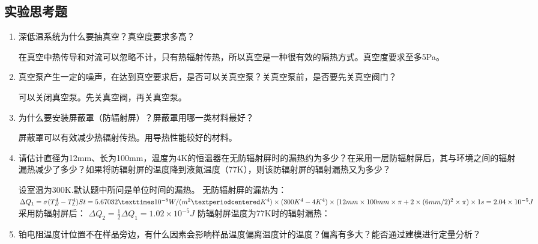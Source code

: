 \documentclass{spaexp}
\begin{document}
        \subsection{实验思考题}
        \begin{enumerate}
            \item 深低温系统为什么要抽真空？真空度要求多高？
            \begin{ans}
                在真空中热传导和对流可以忽略不计，只有热辐射传热，所以真空是一种很有效的隔热方式。真空度要求至多5Pa。
            \end{ans}

            \item 真空泵产生一定的噪声，在达到真空要求后，是否可以关真空泵？关真空泵前，是否要先关真空阀门？
            \begin{ans}
                可以关闭真空泵。先关真空阀，再关真空泵。
            \end{ans}
            
            \item 为什么要安装屏蔽罩（防辐射屏）？屏蔽罩用哪一类材料最好？
            \begin{ans}
                屏蔽罩可以有效减少热辐射传热。用导热性能较好的材料。
            \end{ans}

            \item 请估计直径为12mm、长为100mm，温度为4K的恒温器在无防辐射屏时的漏热约为多少？在采用一层防辐射屏后，其与环境之间的辐射漏热减少了多少？如果将防辐射屏的温度降到液氮温度（77K），则该防辐射屏的辐射漏热又为多少？
            \begin{ans}
                设室温为300K.默认题中所问是单位时间的漏热。
                无防辐射屏的漏热为：
                $\Delta Q_1 = \sigma(T_E^4 - T_L^4)St \\= 5.67032×10^{-8}W/(m^2·K^4)\times(300K^4-4K^4)\times(12mm\times100mm\times\pi+2\times(6mm/2)^2\times\pi)\times1s \\= 2.04\times10^{-5}J$
                采用防辐射屏后：
                $\Delta Q_2 =\frac12\Delta Q_1 = 1.02\times10^{-5}J$
                防辐射屏温度为77K时的辐射漏热：
            \end{ans}
   
            \item 铂电阻温度计位置不在样品旁边，有什么因素会影响样品温度偏离温度计的温度？偏离有多大？能否通过建模进行定量分析？
            \end{enumerate}
\end{document}
